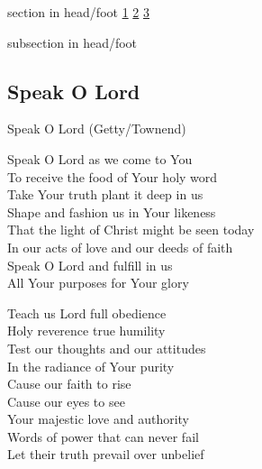 \documentclass{beamer}
\begin{document}
{
{ 
 {
 \begin{beamercolorbox}[ht=4.5ex,dp=1.5ex,%
      leftskip=.3cm,rightskip=.3cm plus1fil]{section in head/foot}
 \fontsize{12}{25}\selectfont 
\hyperlink{Speak O Lord[](Getty/Townend)1}{1}
\hyperlink{Speak O Lord[](Getty/Townend)2}{2}
\hyperlink{Speak O Lord[](Getty/Townend)3}{3}
 
 \end{beamercolorbox}%
  \begin{beamercolorbox}[ht=2.5ex,dp=1.125ex,%
   leftskip=.3cm,rightskip=.3cm plus1fil]{subsection in head/foot}
   \insertauthor
 \end{beamercolorbox}%
 }
}
\subsection{ Speak O Lord }

\hypertarget{Speak O Lord[](Getty/Townend)1}{}
\begin{frame}{Speak O Lord (Getty/Townend)}
\fontsize{ 15 }{ 19 }\selectfont

Speak O Lord as we come to You\\ 
To receive the food of Your holy word\\ 
Take Your truth plant it deep in us\\ 
Shape and fashion us in Your likeness\\ 
That the light of Christ might be seen today\\ 
In our acts of love and our deeds of faith\\ 
Speak O Lord and fulfill in us\\ 
All Your purposes for Your glory 

\end{frame}

\hypertarget{Speak O Lord[](Getty/Townend)2}{}
\begin{frame}{}
\fontsize{ 15 }{ 19 }\selectfont

Teach us Lord full obedience\\ 
Holy reverence true humility\\ 
Test our thoughts and our attitudes\\ 
In the radiance of Your purity\\ 
Cause our faith to rise\\ 
Cause our eyes to see\\ 
Your majestic love and authority\\ 
Words of power that can never fail\\ 
Let their truth prevail over unbelief 


\end{frame}}
\end{document}
